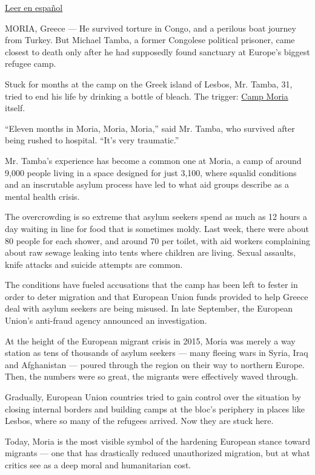 \href{https://www.nytimes3xbfgragh.onion/es/2018/10/04/refugiados-moria-grecia}{Leer
en español}

MORIA, Greece --- He survived torture in Congo, and a perilous boat
journey from Turkey. But Michael Tamba, a former Congolese political
prisoner, came closest to death only after he had supposedly found
sanctuary at Europe's biggest refugee camp.

Stuck for months at the camp on the Greek island of Lesbos, Mr. Tamba,
31, tried to end his life by drinking a bottle of bleach. The trigger:
\href{https://www.nytimes3xbfgragh.onion/2018/03/29/world/europe/greece-lesbos-migrant-crisis-moria.html}{Camp
Moria} itself.

``Eleven months in Moria, Moria, Moria,'' said Mr. Tamba, who survived
after being rushed to hospital. ``It's very traumatic.''

Mr. Tamba's experience has become a common one at Moria, a camp of
around 9,000 people living in a space designed for just 3,100, where
squalid conditions and an inscrutable asylum process have led to what
aid groups describe as a mental health crisis.

The overcrowding is so extreme that asylum seekers spend as much as 12
hours a day waiting in line for food that is sometimes moldy. Last week,
there were about 80 people for each shower, and around 70 per toilet,
with aid workers complaining about raw sewage leaking into tents where
children are living. Sexual assaults, knife attacks and suicide attempts
are common.

The conditions have fueled accusations that the camp has been left to
fester in order to deter migration and that European Union funds
provided to help Greece deal with asylum seekers are being misused. In
late September, the European Union's anti-fraud agency announced an
investigation.

At the height of the European migrant crisis in 2015, Moria was merely a
way station as tens of thousands of asylum seekers --- many fleeing wars
in Syria, Iraq and Afghanistan --- poured through the region on their
way to northern Europe. Then, the numbers were so great, the migrants
were effectively waved through.

Gradually, European Union countries tried to gain control over the
situation by closing internal borders and building camps at the bloc's
periphery in places like Lesbos, where so many of the refugees arrived.
Now they are stuck here.

Today, Moria is the most visible symbol of the hardening European stance
toward migrants --- one that has drastically reduced unauthorized
migration, but at what critics see as a deep moral and humanitarian
cost.

